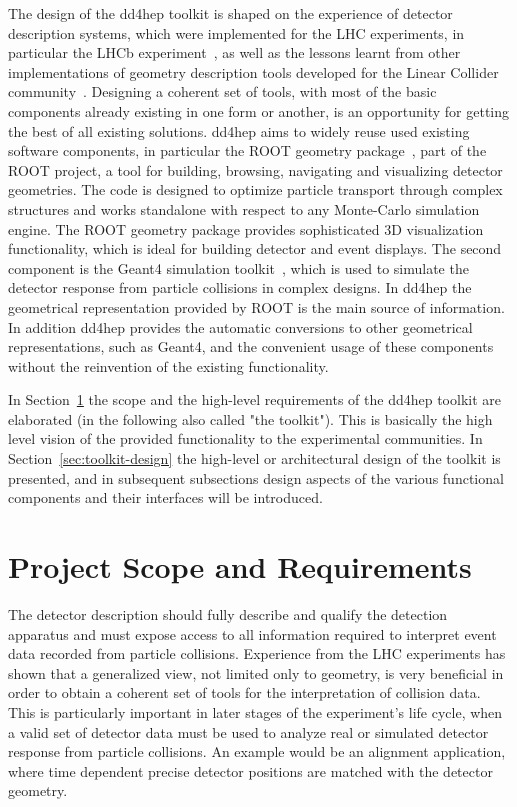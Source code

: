 \documentclass[a4paper]{jpconf}
\begin{document}
\noindent
The design of the dd4hep toolkit\cite{bib:dd4hep} 
is shaped on the experience of detector description 
systems, which were implemented for the LHC experiments, in particular 
the LHCb experiment~\cite{bib:LHCb,bib:LHCb-geometry}, 
as well as the lessons learnt from other
implementations of geometry description tools developed for 
the Linear Collider community~\cite{bib:ILD,bib:SiD}. 
Designing a coherent set of tools, with most of the basic components 
already existing in one form or another, is an opportunity for getting 
the best of all existing solutions. 
dd4hep aims to widely reuse used existing software components, in particular
the ROOT geometry package~\cite{bib:ROOT-tgeo}, part of the 
ROOT project\cite{bib:ROOT}, a tool for 
building, browsing, navigating and visualizing detector geometries. The
code is designed to optimize particle transport through complex 
structures and works standalone with respect to any Monte-Carlo 
simulation engine. The ROOT geometry package provides
sophisticated 3D visualization functionality, which is ideal for building 
detector and event displays. The second component is 
the Geant4 simulation toolkit~\cite{bib:geant4}, which is used to 
simulate the detector response from particle collisions in complex designs.
In dd4hep the geometrical
representation provided by ROOT is the main source of information.
In addition dd4hep provides the automatic conversions to other geometrical 
representations, such as Geant4, and the convenient usage of these 
components without the reinvention of the existing functionality.

\noindent
In Section~\ref{sec:architectural-concepts} the scope and the high-level 
requirements of the dd4hep toolkit are elaborated (in the following 
also called "the toolkit"). This is basically the high level vision 
of the provided functionality to the experimental communities. 
In Section~\ref{sec:toolkit-design} the high-level or architectural design 
of the toolkit is presented, and in subsequent subsections design 
aspects of the various functional components and their interfaces will be
introduced.

\section{Project Scope and Requirements}
\label{sec:architectural-concepts}
\noindent
The detector description should fully describe and qualify 
the detection apparatus and must expose access to all information
required to interpret event data recorded from particle collisions.
Experience from the LHC experiments has shown that a generalized
view, not limited only to geometry, is very beneficial in order to obtain 
a coherent set of tools for the interpretation of collision data.
This is particularly important in later stages of the experiment's life cycle,
when a valid set of detector data must be used to analyze real or simulated 
detector response from particle collisions. An example would be an alignment 
application, where time dependent precise detector positions are matched 
with the detector geometry.
\end{document}
